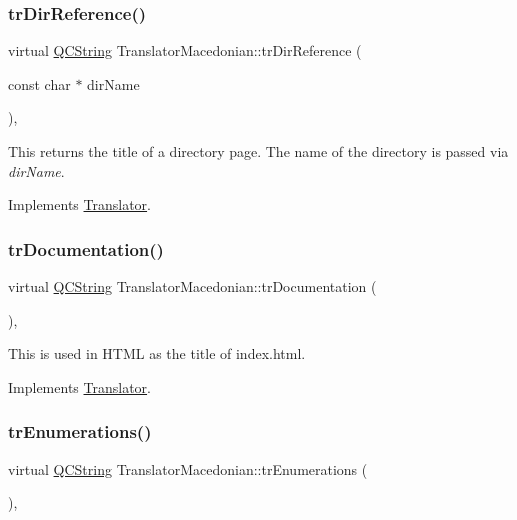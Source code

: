 \subsubsection{\texorpdfstring{trDirReference()}{trDirReference()}}
{\footnotesize\ttfamily virtual \mbox{\hyperlink{class_q_c_string}{Q\+C\+String}} Translator\+Macedonian\+::tr\+Dir\+Reference (\begin{DoxyParamCaption}\item[{const char $\ast$}]{dir\+Name }\end{DoxyParamCaption})\hspace{0.3cm}{\ttfamily [inline]}, {\ttfamily [virtual]}}

This returns the title of a directory page. The name of the directory is passed via {\itshape dir\+Name}. 

Implements \mbox{\hyperlink{class_translator}{Translator}}.

\mbox{\label{class_translator_macedonian_ab6a65cedfccf732902af3374d6e41a2b}} 
\subsubsection{\texorpdfstring{trDocumentation()}{trDocumentation()}}
{\footnotesize\ttfamily virtual \mbox{\hyperlink{class_q_c_string}{Q\+C\+String}} Translator\+Macedonian\+::tr\+Documentation (\begin{DoxyParamCaption}{ }\end{DoxyParamCaption})\hspace{0.3cm}{\ttfamily [inline]}, {\ttfamily [virtual]}}

This is used in H\+T\+ML as the title of index.\+html. 

Implements \mbox{\hyperlink{class_translator}{Translator}}.

\mbox{\label{class_translator_macedonian_ac8997cd71e4d122f234b54dc9ed3fb8d}} 
\subsubsection{\texorpdfstring{trEnumerations()}{trEnumerations()}}
{\footnotesize\ttfamily virtual \mbox{\hyperlink{class_q_c_string}{Q\+C\+String}} Translator\+Macedonian\+::tr\+Enumerations (\begin{DoxyParamCaption}{ }\end{DoxyParamCaption})\hspace{0.3cm}{\ttfamily [inline]}, {\ttfamily [virtual]}}

